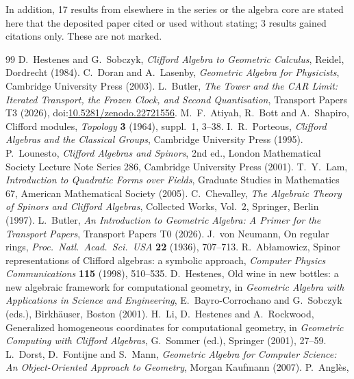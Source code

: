 \documentclass[11pt]{article}
\theoremstyle{definition}
\theoremstyle{plain}
\begin{document}
\noindent In addition, 17 results from elsewhere in the series or the algebra core are stated here that the deposited paper cited or used without stating; 3 results gained citations only. These are not marked.
\begin{thebibliography}{99}
 D.~Hestenes and G.~Sobczyk,
\emph{Clifford Algebra to Geometric Calculus},
Reidel, Dordrecht (1984).
 C.~Doran and A.~Lasenby,
\emph{Geometric Algebra for Physicists},
Cambridge University Press (2003).
 L.~Butler,
\emph{The Tower and the CAR Limit: Iterated Transport, the Frozen Clock, and Second Quantisation},
Transport Papers T3 (2026), doi:\href{https://doi.org/10.5281/zenodo.22721556}{10.5281/zenodo.22721556}.
 M.~F.~Atiyah, R.~Bott and A.~Shapiro,
Clifford modules,
\emph{Topology} \textbf{3} (1964), suppl.~1, 3--38.
 I.~R.~Porteous,
\emph{Clifford Algebras and the Classical Groups},
Cambridge University Press (1995).
 P.~Lounesto,
\emph{Clifford Algebras and Spinors}, 2nd ed.,
London Mathematical Society Lecture Note Series 286, Cambridge University Press (2001).
 T.~Y.~Lam,
\emph{Introduction to Quadratic Forms over Fields},
Graduate Studies in Mathematics 67, American Mathematical Society (2005).
 C.~Chevalley,
\emph{The Algebraic Theory of Spinors and Clifford Algebras},
Collected Works, Vol.~2, Springer, Berlin (1997).
 L.~Butler,
\emph{An Introduction to Geometric Algebra: A Primer for the Transport Papers},
Transport Papers T0 (2026).
 J.~von Neumann,
On regular rings,
\emph{Proc.\ Natl.\ Acad.\ Sci.\ USA} \textbf{22} (1936), 707--713.
 R.~Ab{\l}amowicz,
Spinor representations of Clifford algebras: a symbolic approach,
\emph{Computer Physics Communications} \textbf{115} (1998), 510--535.
 D.~Hestenes,
Old wine in new bottles: a new algebraic framework for computational geometry,
in \emph{Geometric Algebra with Applications in Science and Engineering},
E.~Bayro-Corrochano and G.~Sobczyk (eds.), Birkh\"auser, Boston (2001).
 H.~Li, D.~Hestenes and A.~Rockwood,
Generalized homogeneous coordinates for computational geometry,
in \emph{Geometric Computing with Clifford Algebras},
G.~Sommer (ed.), Springer (2001), 27--59.
 L.~Dorst, D.~Fontijne and S.~Mann,
\emph{Geometric Algebra for Computer Science: An Object-Oriented Approach to Geometry},
Morgan Kaufmann (2007).
 P.~Angl\`es,

\end{thebibliography}
\end{document}
